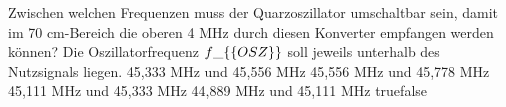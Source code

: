     {Zwischen welchen Frequenzen muss der Quarzoszillator umschaltbar sein, damit im 70 cm-Bereich die oberen 4 MHz durch diesen Konverter empfangen werden können? Die Oszillatorfrequenz $f\_\{\textrm\{OSZ\}\}$ soll jeweils unterhalb des Nutzsignals liegen.}
    {45,333 MHz und 45,556 MHz}
    {45,556 MHz und 45,778 MHz}
    {45,111 MHz und 45,333 MHz}
    {44,889 MHz und 45,111 MHz}
    {true}{false}